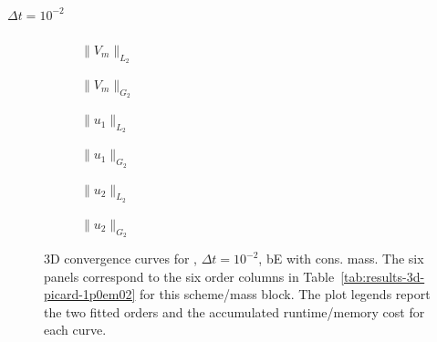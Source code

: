 \paragraph{$\Delta t=10^{-2}$}

\begin{figure}[p]
\centering
\begin{subfigure}{0.485\linewidth}
\centering
{}
\caption{$\|V_m\|_{L_2}$}
\label{fig:results-3d-picard-1p0em02-backwardeuler-consistent-a}
\end{subfigure}
\hfill
\begin{subfigure}{0.485\linewidth}
\centering
{}
\caption{$\|V_m\|_{G_2}$}
\label{fig:results-3d-picard-1p0em02-backwardeuler-consistent-b}
\end{subfigure}
\par\vspace{0.8em}
\begin{subfigure}{0.485\linewidth}
\centering
{}
\caption{$\|u_1\|_{L_2}$}
\label{fig:results-3d-picard-1p0em02-backwardeuler-consistent-c}
\end{subfigure}
\hfill
\begin{subfigure}{0.485\linewidth}
\centering
{}
\caption{$\|u_1\|_{G_2}$}
\label{fig:results-3d-picard-1p0em02-backwardeuler-consistent-d}
\end{subfigure}
\par\vspace{0.8em}
\begin{subfigure}{0.485\linewidth}
\centering
{}
\caption{$\|u_2\|_{L_2}$}
\label{fig:results-3d-picard-1p0em02-backwardeuler-consistent-e}
\end{subfigure}
\hfill
\begin{subfigure}{0.485\linewidth}
\centering
{}
\caption{$\|u_2\|_{G_2}$}
\label{fig:results-3d-picard-1p0em02-backwardeuler-consistent-f}
\end{subfigure}
\caption{3D convergence curves for , $\Delta t=10^{-2}$, bE with cons. mass. The six panels correspond to the six order columns in Table~\ref{tab:results-3d-picard-1p0em02} for this scheme/mass block. The plot legends report the two fitted orders and the accumulated runtime/memory cost for each curve.}
\label{fig:results-3d-picard-1p0em02-backwardeuler-consistent}
\end{figure}
\FloatBarrier

